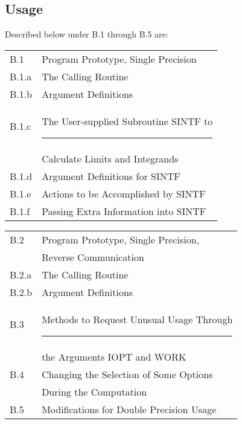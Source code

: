 \documentclass[twoside]{MATH77}
\begin{document}
\subsection{Usage}

Described below under B.1 through B.5 are:

\begin{tabular*}{3.3in}{@{}l@{~~}l}
B.1 & \hspace{-20pt} Program Prototype, Single Precision\dotfill
\pageref{PPSP}\\
\quad B.1.a & The Calling Routine\dotfill \pageref{Calling}\\
\quad B.1.b & Argument Definitions\dotfill \pageref{ArgDef}\\
\quad B.1.c & The User-supplied Subroutine SINTF to\rule{.34in}{0pt}\\
 & Calculate Limits and Integrands\dotfill \pageref{SINTF}\\
\quad B.1.d & Argument Definitions for SINTF\dotfill \pageref{ArgSINTF}\\
\quad B.1.e & Actions to be Accomplished by SINTF\dotfill \pageref{ActSINTF}\\
\quad B.1.f & Passing Extra Information into SINTF\dotfill \pageref{ExtSINTF}\\
\end{tabular*}

\begin{tabular*}{3.3in}{@{}l@{~~}l}
B.2 & \hspace{-20pt} Program Prototype, Single Precision,\\
 & \hspace{-20pt} Reverse Communication\dotfill \pageref{PPRC}\\
\quad B.2.a & The Calling Routine\dotfill \pageref{CallingRC}\\
\quad B.2.b & Argument Definitions\dotfill \pageref{ArgDefRC}\\
B.3 & \hspace{-20pt} Methods to Request Unusual Usage
Through\rule{.3in}{0pt}\\
 & \hspace{-20pt} the Arguments IOPT and WORK\dotfill \pageref{UnusualUse}\\
B.4 & \hspace{-20pt} Changing the Selection of Some Options\\
 & \hspace{-20pt} During the Computation\dotfill \pageref{ChangeSel}\\
B.5 & \hspace{-20pt} Modifications for Double Precision
Usage\dotfill \pageref{DPuse}\\
\end{tabular*}
\end{document}
